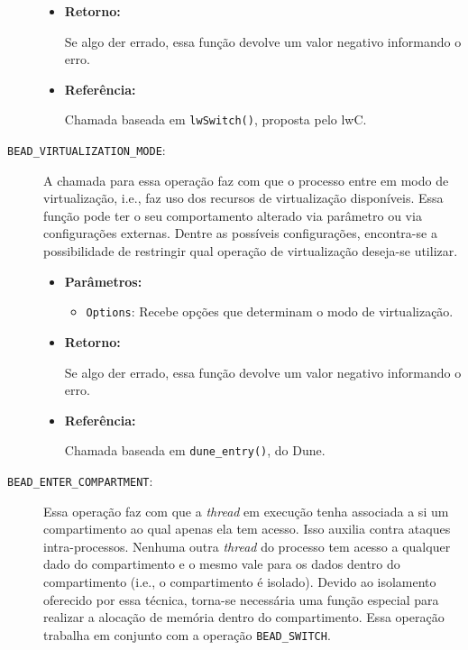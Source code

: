 \begin{description}
\begin{itemize}
    \item \textbf{Retorno:}

Se algo der errado, essa função devolve um valor negativo informando o erro.

    \item \textbf{Referência:}

Chamada baseada em \texttt{lwSwitch()}, proposta pelo lwC.

  \end{itemize}

  \item [\texttt{BEAD\_VIRTUALIZATION\_MODE}:]

A chamada para essa operação faz com que o processo entre em modo de
virtualização, i.e., faz uso dos recursos de virtualização disponíveis. Essa função pode ter o seu comportamento alterado via parâmetro ou via
configurações externas. Dentre as possíveis configurações, encontra-se a
possibilidade de restringir qual operação de virtualização deseja-se utilizar.

  \begin{itemize}
    \item \textbf{Parâmetros:}

    \begin{itemize}
    \item \texttt{Options}: Recebe opções que determinam o modo de virtualização.
    \end{itemize}

    \item \textbf{Retorno:}

Se algo der errado, essa função devolve um valor negativo informando o erro.

    \item \textbf{Referência:}

Chamada baseada em \texttt{dune\_entry()}, do Dune.

  \end{itemize}

  \item [\texttt{BEAD\_ENTER\_COMPARTMENT}:]

Essa operação faz com que a \emph{thread} em execução tenha associada a si um
compartimento ao qual apenas ela tem acesso. Isso auxilia contra
ataques intra-processos. Nenhuma outra \emph{thread} do processo tem acesso a qualquer
dado do compartimento e o mesmo vale para os dados dentro do compartimento
(i.e., o compartimento é isolado). Devido ao isolamento oferecido por essa
técnica, torna-se necessária uma função especial para realizar a alocação de memória
dentro do compartimento. Essa operação trabalha em conjunto com a operação
\texttt{BEAD\_SWITCH}.


\end{description}
